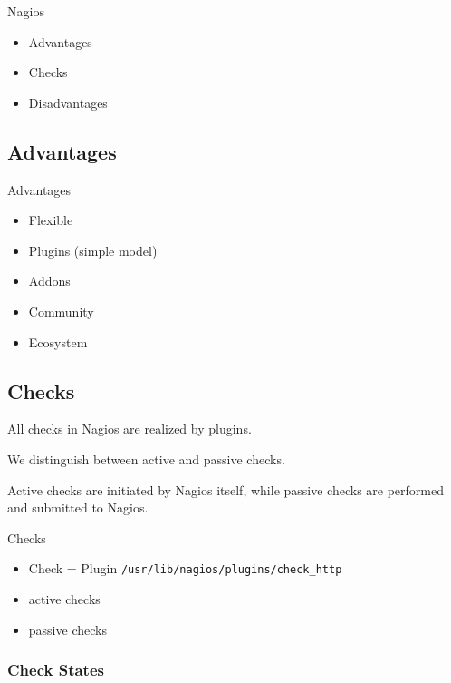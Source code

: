 \begin{frame}[fragile]{Nagios}
\begin{itemize}
\item Advantages
\item Checks
\item Disadvantages
\end{itemize}
\end{frame}

\subsection{Advantages}
\begin{frame}[fragile]{Advantages}
\begin{itemize}
\item Flexible
\item Plugins (simple model)
\item Addons
\item Community
\item Ecosystem
\end{itemize}
\end{frame}

\subsection{Checks}
All checks in Nagios are realized by plugins.

We distinguish between active and passive checks.

Active checks are initiated by Nagios itself,
while passive checks are performed and submitted
to Nagios.

\begin{frame}[fragile]{Checks}
\begin{itemize}
\item Check = Plugin
\verb|/usr/lib/nagios/plugins/check_http|
\end{itemize}

\begin{itemize}
\item active checks
\item passive checks
\end{itemize}

\end{frame}

\subsubsection{Check States}


